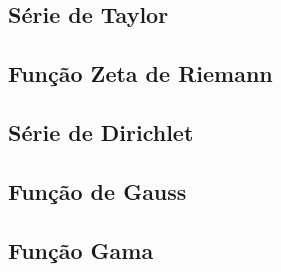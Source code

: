\subsection{Série de Taylor}
\subsection{Função Zeta de Riemann}
\subsection{Série de Dirichlet}
\subsection{Função de Gauss}
\subsection{Função Gama}